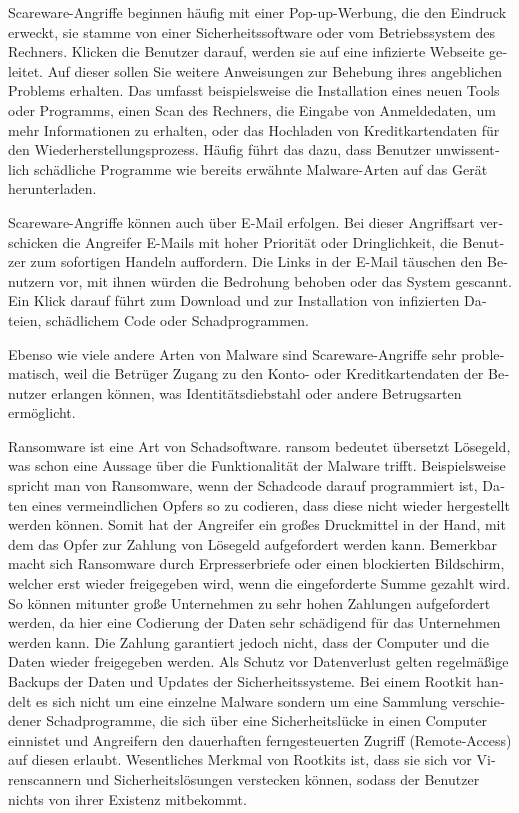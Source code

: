 \begin{otherlanguage}{ngerman}
    Scareware-Angriffe beginnen häufig mit einer Pop-up-Werbung, die den Eindruck erweckt, sie stamme von einer Sicherheitssoftware oder vom Betriebssystem des Rechners. Klicken die Benutzer darauf, werden sie auf eine infizierte Webseite geleitet. Auf dieser sollen Sie weitere Anweisungen zur Behebung ihres angeblichen Problems erhalten. Das umfasst beispielsweise die Installation eines neuen Tools oder Programms, einen Scan des Rechners, die Eingabe von Anmeldedaten, um mehr Informationen zu erhalten, oder das Hochladen von Kreditkartendaten für den Wiederherstellungsprozess. 
    Häufig führt das dazu, dass Benutzer unwissentlich schädliche Programme wie bereits erwähnte Malware-Arten auf das Gerät herunterladen.

    Scareware-Angriffe können auch über E-Mail erfolgen. Bei dieser Angriffsart verschicken die Angreifer E-Mails mit hoher Priorität oder Dringlichkeit, die Benutzer zum sofortigen Handeln auffordern. Die Links in der E-Mail täuschen den Benutzern vor, mit ihnen würden die Bedrohung behoben oder das System gescannt. Ein Klick darauf führt zum Download und zur Installation von infizierten Dateien, schädlichem Code oder Schadprogrammen.
    
    Ebenso wie viele andere Arten von Malware sind Scareware-Angriffe sehr problematisch, weil die Betrüger Zugang zu den Konto- oder Kreditkartendaten der Benutzer erlangen können, was Identitätsdiebstahl oder andere Betrugsarten ermöglicht.
    
    Ransomware ist eine Art von Schadsoftware. \dq ransom \dq{} bedeutet übersetzt Lösegeld, was schon eine Aussage über die Funktionalität der Malware trifft. Beispielsweise spricht man von Ransomware, wenn der Schadcode darauf programmiert ist, Daten eines vermeindlichen Opfers so zu codieren, dass diese nicht wieder hergestellt werden können. Somit hat der Angreifer ein großes Druckmittel in der Hand, mit dem das Opfer zur Zahlung von Lösegeld aufgefordert werden kann. Bemerkbar macht sich Ransomware durch Erpresserbriefe oder einen blockierten Bildschirm, welcher erst wieder freigegeben wird, wenn die eingeforderte Summe gezahlt wird. So können mitunter große Unternehmen zu sehr hohen Zahlungen aufgefordert werden, da hier eine Codierung der Daten sehr schädigend für das Unternehmen werden kann. Die Zahlung garantiert jedoch nicht, dass der Computer und die Daten wieder freigegeben werden. Als Schutz vor Datenverlust gelten regelmäßige Backups der Daten und Updates der Sicherheitssysteme.
    Bei einem Rootkit handelt es sich nicht um eine einzelne Malware sondern um eine Sammlung verschiedener Schadprogramme, die sich über eine Sicherheitslücke in einen Computer einnistet und Angreifern den dauerhaften ferngesteuerten Zugriff (Remote-Access) auf diesen erlaubt. Wesentliches Merkmal von Rootkits ist, dass sie sich vor Virenscannern und Sicherheitslösungen verstecken können, sodass der Benutzer nichts von ihrer Existenz mitbekommt.


\end{otherlanguage}
